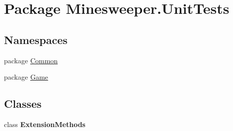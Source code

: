 \hypertarget{namespace_minesweeper_1_1_unit_tests}{\section{Package Minesweeper.\+Unit\+Tests}
\label{namespace_minesweeper_1_1_unit_tests}
}
\subsection*{Namespaces}
\begin{DoxyCompactItemize}
\item 
package \hyperlink{namespace_minesweeper_1_1_unit_tests_1_1_common}{Common}
\item 
package \hyperlink{namespace_minesweeper_1_1_unit_tests_1_1_game}{Game}
\end{DoxyCompactItemize}
\subsection*{Classes}
\begin{DoxyCompactItemize}
\item 
class {\bfseries Extension\+Methods}
\end{DoxyCompactItemize}
